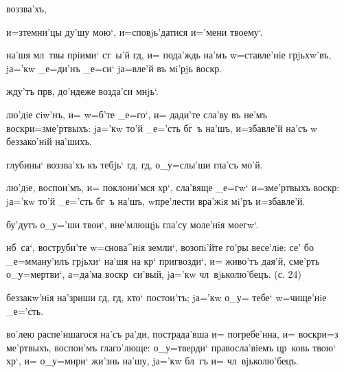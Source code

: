 
        воззва'хъ, 


  и=з\ъ темни'цы ду'шу мою`, 
и=сповjь'датися и='мени твоему`.

 на'шя мл~твы прiими` ст~ы'й гд, и= 
пода'ждь на'мъ w=ставле'нiе грjьхw'въ, jа='кw _е=ди'нъ 
_е=си` jа=вле'й въ мi'рjь воскр.

  жду'тъ прв, до'ндеже возда'си 
мнjь`.

 лю'дiе сiw'нъ, и= w=б'те _е=го`, и= 
дади'те сла'ву въ не'мъ воскр и=з\ъ ме'ртвыхъ: 
jа='кw то'й _е='сть бг~ъ на'шъ, и=збавле'й на'съ w\т 
беззако'нiй на'шихъ.

  глубины` воззва'хъ къ тебjь` гд, 
гд, о_у=слы'ши гла'съ мо'й.

 лю'дiе, воспои'мъ, и= поклони'мся хр`, 
сла'вяще _е=гw` и=з\ъ ме'ртвыхъ воскр: jа='кw то'й 
_е='сть бг~ъ на'шъ, w\т пре'лести вра'жiя мi'ръ 
и=збавле'й.


  бу'дутъ о_у='ши твои`, вне'млющjь гла'су 
моле'нiя моегw`.

 нб~са`, воструби'те w=снова^нiя земли`, 
возопi'йте го'ры весе'лiе: се' бо _е=мману'илъ грjьхи` 
на'шя на кр` пригвозди`, и= живо'тъ дая'й, сме'рть 
о_у=мертви`, а=да'ма воскр~си'вый, jа='кw 
чл~вjьколю'бецъ. (с. 24)

  беззакw'нiя на'зриши гд, гд, кто` 
постои'тъ; jа='кw о_у= тебе` w=чище'нiе _е='сть.

 во'лею распе'ншагося на'съ ра'ди, 
пострада'вша и= погребе'нна, и= воскр и=з\ъ 
ме'ртвыхъ, воспои'мъ глаго'люще: о_у=тверди` 
правосла'вiемъ цр~ковь твою` хр`, и= о_у=мири` жи'знь 
на'шу, jа='кw бл~гъ и= чл~вjьколю'бецъ.

